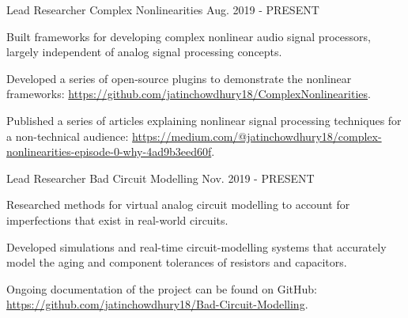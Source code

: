 
\begin{cventries}

    \cventry
    {Lead Researcher} %
    {Complex Nonlinearities} %
    {} %
    {Aug. 2019 - PRESENT} %
    {
      \begin{cvitems} %
        \item {Built frameworks for developing complex nonlinear audio signal
               processors, largely independent of analog signal processing concepts.}
        \item {Developed a series of open-source plugins to demonstrate the nonlinear frameworks:
              \url{https://github.com/jatinchowdhury18/ComplexNonlinearities}.}
        \item {Published a series of articles explaining nonlinear signal
               processing techniques for a non-technical audience:
               \url{https://medium.com/@jatinchowdhury18/complex-nonlinearities-episode-0-why-4ad9b3eed60f}.}
      \end{cvitems}
    }

    \cventry
    {Lead Researcher} %
    {Bad Circuit Modelling} %
    {} %
    {Nov. 2019 - PRESENT} %
    {
        \begin{cvitems}
              \item{Researched methods for virtual analog circuit modelling
                    to account for imperfections that exist in real-world circuits.}
              \item{Developed simulations and real-time circuit-modelling systems that
                    accurately model the aging and component tolerances of resistors and capacitors.}
              \item{Ongoing documentation of the project can be found on GitHub:
                    \url{https://github.com/jatinchowdhury18/Bad-Circuit-Modelling}.}
        \end{cvitems}
    }


\end{cventries}
